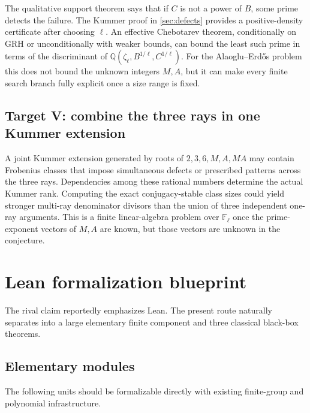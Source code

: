 \documentclass[11pt]{article}
\theoremstyle{definition}
\newcommand{\Q}{\mathbb Q}
\newcommand{\F}{\mathbb F}
\newcommand{\AEname}{Alaoglu--Erd\H{o}s}
\begin{document}
The qualitative support theorem says that if $C$ is not a power of $B$, some prime detects the
failure.  The Kummer proof in \cref{sec:defects} provides a positive-density certificate after
choosing $\ell$.  An effective Chebotarev theorem, conditionally on GRH or unconditionally with
weaker bounds, can bound the least such prime in terms of the discriminant of
$\Q(\zeta_\ell,B^{1/\ell},C^{1/\ell})$.  For the \AEname{} problem this does not bound the unknown
integers $M,A$, but it can make every finite search branch fully explicit once a size range is
fixed.

\subsection{Target V: combine the three rays in one Kummer extension}

A joint Kummer extension generated by roots of
$2,3,6,M,A,MA$ may contain Frobenius classes that impose simultaneous defects or prescribed
patterns across the three rays.  Dependencies among these rational numbers determine the
actual Kummer rank.  Computing the exact conjugacy-stable class sizes could yield stronger
multi-ray denominator divisors than the union of three independent one-ray arguments.  This is
a finite linear-algebra problem over $\F_\ell$ once the prime-exponent vectors of $M,A$ are
known, but those vectors are unknown in the conjecture.

\section{Lean formalization blueprint}
\label{sec:lean}

The rival claim reportedly emphasizes Lean.  The present route naturally separates into a
large elementary finite component and three classical black-box theorems.

\subsection{Elementary modules}

The following units should be formalizable directly with existing finite-group and polynomial
infrastructure.
\end{document}
